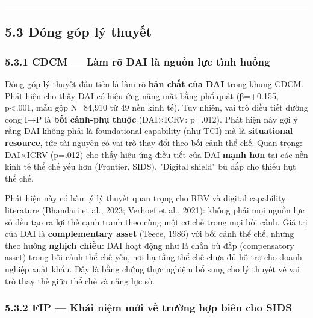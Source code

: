 \documentclass[12pt,a4paper]{article}
\begin{document}
\begin{center}\rule{0.5\linewidth}{0.5pt}\end{center}

\hypertarget{53-ux111uxf3ng-guxf3p-luxfd-thuyux1ebft}{%
\subsection{5.3 Đóng góp lý
thuyết}\label{53-ux111uxf3ng-guxf3p-luxfd-thuyux1ebft}}

\hypertarget{531-cdcm--luxe0m-ruxf5-dai-luxe0-nguux1ed3n-lux1ef1c-tuxecnh-huux1ed1ng}{%
\subsubsection{5.3.1 CDCM --- Làm rõ DAI là nguồn lực tình
huống}\label{531-cdcm--luxe0m-ruxf5-dai-luxe0-nguux1ed3n-lux1ef1c-tuxecnh-huux1ed1ng}}

Đóng góp lý thuyết đầu tiên là làm rõ \textbf{bản chất của DAI} trong
khung CDCM. Phát hiện cho thấy DAI có hiệu ứng nâng mặt bằng phổ quát
(β=+0.155, p\textless.001, mẫu gộp N=84,910 từ 49 nền kinh tế). Tuy
nhiên, vai trò điều tiết đường cong I→P là \textbf{bối cảnh-phụ thuộc}
(DAI×ICRV: p=.012). Phát hiện này gợi ý rằng DAI không phải là
foundational capability (như TCI) mà là \textbf{situational resource},
tức tài nguyên có vai trò thay đổi theo bối cảnh thể chế. Quan trọng:
DAI×ICRV (p=.012) cho thấy hiệu ứng điều tiết của DAI \textbf{mạnh hơn}
tại các nền kinh tế thể chế yếu hơn (Frontier, SIDS). "Digital shield"
bù đắp cho thiếu hụt thể chế.

Phát hiện này có hàm ý lý thuyết quan trọng cho RBV và digital
capability literature (Bhandari et al., 2023; Verhoef et al., 2021):
không phải mọi nguồn lực số đều tạo ra lợi thế cạnh tranh theo cùng một
cơ chế trong mọi bối cảnh. Giá trị của DAI là \textbf{complementary
asset} (Teece, 1986) với bối cảnh thể chế, nhưng theo hướng
\textbf{nghịch chiều}: DAI hoạt động như lá chắn bù đắp (compensatory
asset) trong bối cảnh thể chế yếu, nơi hạ tầng thể chế chưa đủ hỗ trợ
cho doanh nghiệp xuất khẩu. Đây là bằng chứng thực nghiệm bổ sung cho lý
thuyết về vai trò thay thế giữa thể chế và năng lực số.

\hypertarget{532-fip--khuxe1i-niux1ec7m-mux1edbi-vux1ec1-trux1b0ux1eddng-hux1ee3p-biuxean-cho-sids}{%
\subsubsection{5.3.2 FIP --- Khái niệm mới về trường hợp biên cho
SIDS}\label{532-fip--khuxe1i-niux1ec7m-mux1edbi-vux1ec1-trux1b0ux1eddng-hux1ee3p-biuxean-cho-sids}}
\end{document}
